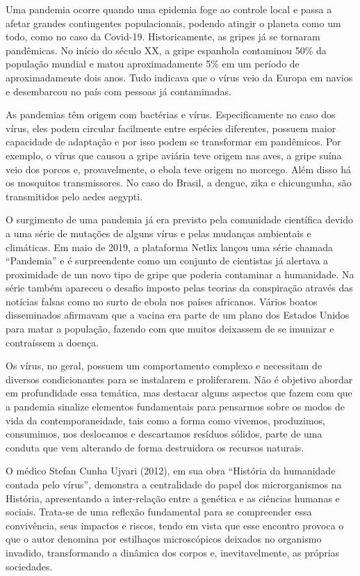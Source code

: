 Uma pandemia ocorre quando uma epidemia foge ao controle local e passa a
afetar grandes contingentes populacionais, podendo atingir o planeta
como um todo, como no caso da Covid-19. Historicamente, as gripes já se
tornaram pandêmicas. No início do século XX, a gripe espanhola
contaminou 50\% da população mundial e matou aproximadamente 5\% em um
período de aproximadamente dois anos. Tudo indicava que o vírus veio da
Europa em navios e desembarcou no país com pessoas já contaminadas.

As pandemias têm origem com bactérias e vírus. Especificamente
no caso dos vírus, eles podem circular facilmente entre espécies
diferentes, possuem maior capacidade de adaptação e por isso podem se
transformar em pandêmicos. Por exemplo, o vírus que causou a gripe
aviária teve origem nas aves, a gripe suína veio dos porcos e,
provavelmente, o ebola teve origem no morcego. Além disso há os
mosquitos transmissores. No caso do Brasil, a dengue, zika e
chicungunha, são transmitidos pelo aedes aegypti.

O surgimento de uma pandemia já era previsto pela comunidade científica
devido a uma série de mutações de alguns vírus e pelas mudanças
ambientais e climáticas. Em maio de 2019, a plataforma Netlix lançou uma
série chamada ``Pandemia'' e é surpreendente como um conjunto de
cientistas já alertava a proximidade de um novo tipo de gripe que
poderia contaminar a humanidade. Na série também apareceu o desafio
imposto pelas teorias da conspiração através das notícias falsas como no
surto de ebola nos países africanos. Vários boatos disseminados
afirmavam que a vacina era parte de um plano dos Estados Unidos para
matar a população, fazendo com que muitos deixassem de se imunizar e
contraíssem a doença.

Os vírus, no geral, possuem um comportamento complexo e necessitam de
diversos condicionantes para se instalarem e proliferarem. Não é
objetivo abordar em profundidade essa temática, mas destacar alguns
aspectos que fazem com que a pandemia sinalize elementos fundamentais
para pensarmos sobre os modos de vida da contemporaneidade, tais como a
forma como vivemos, produzimos, consumimos, nos deslocamos e descartamos
resíduos sólidos, parte de uma conduta que vem alterando de forma
destruidora os recursos naturais.

O médico Stefan Cunha Ujvari (2012), em sua obra ``História da
humanidade contada pelo vírus'', demonstra a centralidade do papel dos
microrganismos na História, apresentando a inter-relação entre a
genética e as ciências humanas e sociais. Trata-se de uma reflexão
fundamental para se compreender essa convivência, seus impactos e
riscos, tendo em vista que esse encontro provoca o que o autor denomina
por estilhaços microscópicos deixados no organismo invadido,
transformando a dinâmica dos corpos e, inevitavelmente, as próprias
sociedades.

